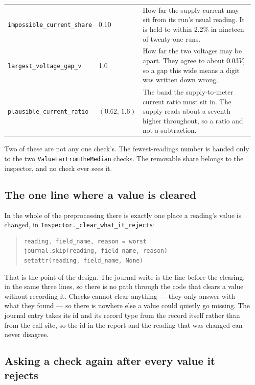 \begin{table}[htbp]
\begin{tabular}{@{}llp{}@{}}
    \texttt{impossible\_current\_share} & 0.10
      & How far the supply current may sit from its run's usual reading. It is held to
        within 2.2\% in nineteen of twenty-one runs. \\
    \texttt{largest\_voltage\_gap\_v} & 1.0
      & How far the two voltages may be apart. They agree to about $0.03\unit{V}$, so a gap
        this wide means a digit was written down wrong. \\
    \texttt{plausible\_current\_ratio} & $(0.62,\,1.6)$
      & The band the supply-to-meter current ratio must sit in. The supply reads about a
        seventh higher throughout, so a ratio and not a subtraction. \\
    \bottomrule
  \end{tabular}
\end{table}

Two of these are not any one check's. The fewest-readings number is handed only to the two
\texttt{ValueFarFromTheMedian} checks. The removable share belongs to the inspector, and no
check ever sees it.

\subsection{The one line where a value is cleared}

In the whole of the preprocessing there is exactly one place a reading's value is changed, in
\texttt{Inspector.\_clear\_what\_it\_rejects}:

\begin{quote}
\begin{verbatim}
reading, field_name, reason = worst
journal.skip(reading, field_name, reason)
setattr(reading, field_name, None)
\end{verbatim}
\end{quote}

That is the point of the design. The journal write is the line before the clearing, in the same
three lines, so there is no path through the code that clears a value without recording it.
Checks cannot clear anything --- they only answer with what they found --- so there is nowhere
else a value could quietly go missing. The journal entry takes its id and its record type from
the record itself rather than from the call site, so the id in the report and the reading that
was changed can never disagree.

\subsection{Asking a check again after every value it rejects}

